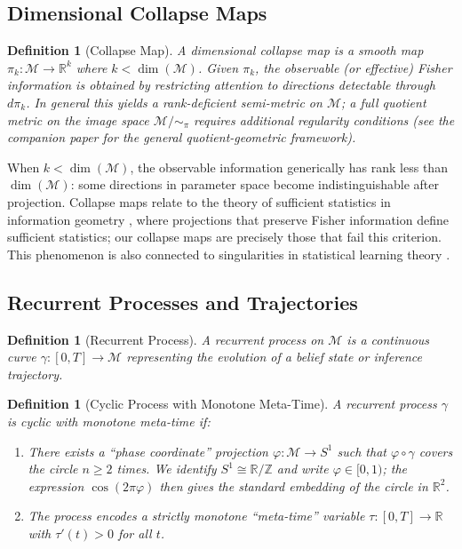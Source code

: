 \documentclass[12pt]{article}
\newtheorem{definition}[theorem]{Definition}
\newcommand{\R}{\mathbb{R}}
\newcommand{\M}{\mathcal{M}}
\begin{document}
\subsection{Dimensional Collapse Maps}

\begin{definition}[Collapse Map]\label{def:collapse}
A \emph{dimensional collapse map} is a smooth map $\pi_k: \M \to \R^k$ where $k < \dim(\M)$. Given $\pi_k$, the \emph{observable} (or \emph{effective}) Fisher information is obtained by restricting attention to directions detectable through $d\pi_k$. In general this yields a rank-deficient semi-metric on $\M$; a full quotient metric on the image space $\M/{\sim_\pi}$ requires additional regularity conditions (see the companion paper for the general quotient-geometric framework).
\end{definition}

When $k < \dim(\M)$, the observable information generically has rank less than $\dim(\M)$: some directions in parameter space become indistinguishable after projection. Collapse maps relate to the theory of sufficient statistics in information geometry \citep{ay2017information}, where projections that preserve Fisher information define sufficient statistics; our collapse maps are precisely those that fail this criterion. This phenomenon is also connected to singularities in statistical learning theory \citep{watanabe2009algebraic}.

\subsection{Recurrent Processes and Trajectories}

\begin{definition}[Recurrent Process]
A \emph{recurrent process} on $\M$ is a continuous curve $\gamma: [0, T] \to \M$ representing the evolution of a belief state or inference trajectory.
\end{definition}

\begin{definition}[Cyclic Process with Monotone Meta-Time]\label{def:cyclic}
A recurrent process $\gamma$ is \emph{cyclic with monotone meta-time} if:
\begin{enumerate}
    \item There exists a ``phase coordinate'' projection $\varphi: \M \to S^1$ such that $\varphi \circ \gamma$ covers the circle $n \geq 2$ times. We identify $S^1 \cong \R/\mathbb{Z}$ and write $\varphi \in [0,1)$; the expression $\cos(2\pi\varphi)$ then gives the standard embedding of the circle in $\R^2$.
    \item The process encodes a strictly monotone ``meta-time'' variable $\tau: [0,T] \to \R$ with $\tau'(t) > 0$ for all $t$.
\end{enumerate}
\end{definition}
\end{document}
